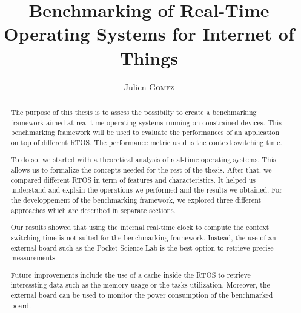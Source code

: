 \documentclass{EPL-master-thesis-covers-EN}
\title{Benchmarking of Real-Time Operating Systems for Internet of Things}
\author{Julien \textsc{Gomez}}
\begin{document}
  \maketitle

\cleardoublepage
{}

 \begin{abstract}

    The purpose of this thesis is to assess the possibilty to create a benchmarking framework aimed at 
      real-time operating systems running on constrained devices. 
    This benchmarking framework will be used to evaluate the performances of an application on top of different RTOS.
    The performance metric used is the context switching time.

    To do so, we started with a theoretical analysis of real-time operating systems.
    This allows us to formalize the concepts needed for the rest of the thesis.
    After that, we compared different RTOS in term of features and characteristics.
    It helped us understand and explain the operations we performed and the results we obtained.
    For the developpement of the benchmarking framework, we explored three different approaches which are described in separate sections.
    
    Our results showed that using the internal real-time clock to compute the context switching time is not suited for the benchmarking framework.
    Instead, the use of an external board such as the Pocket Science Lab is the best option to retrieve precise measurements.

    Future improvements include the use of a cache inside the RTOS to retrieve interessting data such as the memory usage or the tasks utilization.
    Moreover, the external board can be used to monitor the power consumption of the benchmarked board.
    
 \end{abstract}

\renewcommand{\abstractname}{Acknowledgements}
\begin{abstract}
\end{abstract}
\end{document}
